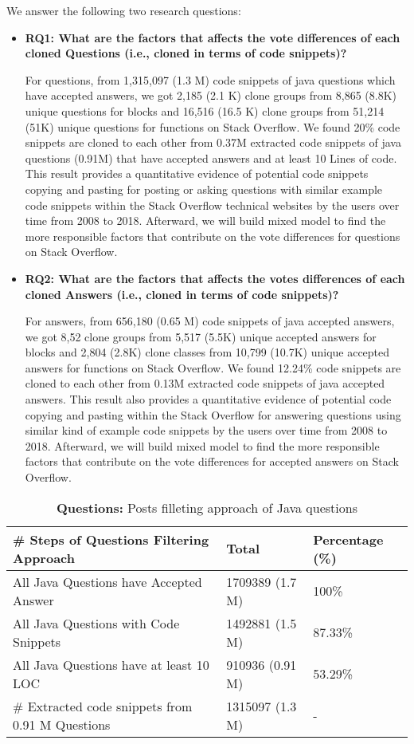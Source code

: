 \documentclass[conference]{IEEEtran}
\begin{document}
	We answer the following two research questions:
	\begin{itemize}
		\item \textbf{RQ1: What are the factors that affects the vote differences of each cloned Questions (i.e., cloned in terms of code snippets)?}
		
		For questions, from 1,315,097 (1.3 M) code snippets of java questions which have accepted answers, we got 2,185 (2.1 K) clone groups from 8,865 (8.8K) unique questions for blocks and 16,516 (16.5 K) clone groups from 51,214 (51K) unique questions for functions on Stack Overflow. We found 20\% code snippets are cloned to each other from 0.37M extracted code snippets of java questions (0.91M) that have accepted answers and at least 10 Lines of code. This result provides a quantitative evidence of potential code snippets copying and pasting for posting or asking questions with similar example code snippets within the Stack Overflow technical websites by the users over time from 2008 to 2018. Afterward, we will build mixed model to find the more responsible factors that contribute on the vote differences for questions on Stack Overflow.\newline
		\item \textbf{RQ2: What are the factors that affects the votes differences of each cloned Answers (i.e., cloned in terms of code snippets)?}
		
		For answers, from 656,180 (0.65 M) code snippets of java accepted answers, we got 8,52 clone groups from 5,517  (5.5K)  unique accepted answers for blocks and 2,804 (2.8K)  clone classes from 10,799 (10.7K) unique accepted answers for functions on Stack Overflow. We found 12.24\% code snippets are cloned to each other from 0.13M extracted code snippets of java accepted answers. This result also provides a quantitative evidence of potential code copying and pasting within the Stack Overflow for answering questions using similar kind of example code snippets by the users over time from 2008 to 2018. Afterward, we will build mixed model to find the more responsible factors that contribute on the vote differences for accepted answers on Stack Overflow.\newline
	\end{itemize}
	
	
	\begin{table*}[ht]
		\caption{\textbf{Questions:}  Posts filleting approach of Java questions}
		\centering
		\begin{tabular}{l l l }
			\hline\hline
			\# Steps of Questions Filtering Approach & Total & Percentage (\%) \\ [0.5ex]
			\hline
			All Java Questions have Accepted Answer & 1709389 (1.7 M) & 100\% \\
			All Java Questions with Code Snippets & 1492881 (1.5 M) & 87.33\% \\
			All Java Questions have at least 10 LOC  & 910936 (0.91 M) & 53.29\% \\
			\# Extracted code snippets from 0.91 M Questions &1315097 (1.3 M) & - \\  [1ex]
			\hline
		\end{tabular}
		\label{table:JavaQuestions}
	\end{table*}
	
\end{document}
